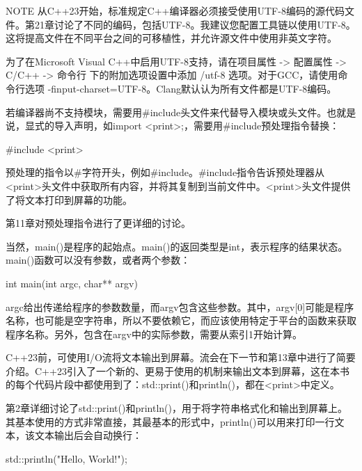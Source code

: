 \begin{myNotic}{NOTE}
从C++23开始，标准规定C++编译器必须接受使用UTF-8编码的源代码文件。第21章讨论了不同的编码，包括UTF-8。我建议您配置工具链以使用UTF-8。这将提高文件在不同平台之间的可移植性，并允许源文件中使用非英文字符。

为了在Microsoft Visual C++中启用UTF-8支持，请在项目属性 -> 配置属性 -> C/C++ -> 命令行 下的附加选项设置中添加 /utf-8 选项。对于GCC，请使用命令行选项 -finput-charset=UTF-8。Clang默认认为所有文件都是UTF-8编码。
\end{myNotic}


若编译器尚不支持模块，需要用\#include头文件来代替导入模块或头文件。也就是说，显式的导入声明，如import <print>;，需要用\#include预处理指令替换：

\begin{cpp}
#include <print>
\end{cpp}

预处理的指令以\#字符开头，例如\#include。\#include指令告诉预处理器从<print>头文件中获取所有内容，并将其复制到当前文件中。<print>头文件提供了将文本打印到屏幕的功能。

第11章对预处理指令进行了更详细的讨论。


当然，main()是程序的起始点。main()的返回类型是int，表示程序的结果状态。main()函数可以没有参数，或者两个参数：

\begin{cpp}
int main(int argc, char** argv)
\end{cpp}

argc给出传递给程序的参数数量，而argv包含这些参数。其中，argv[0]可能是程序名称，也可能是空字符串，所以不要依赖它，而应该使用特定于平台的函数来获取程序名称。另外，包含在argv中的实际参数，需要从索引1开始计算。



C++23前，可使用I/O流将文本输出到屏幕。流会在下一节和第13章中进行了简要介绍。C++23引入了一个新的、更易于使用的机制来输出文本到屏幕，这在本书的每个代码片段中都使用到了：std::print()和println()，都在<print>中定义。

第2章详细讨论了std::print()和println()，用于将字符串格式化和输出到屏幕上。其基本使用的方式非常直接，其最基本的形式中，println()可以用来打印一行文本，该文本输出后会自动换行：

\begin{cpp}
std::println("Hello, World!");
\end{cpp}

